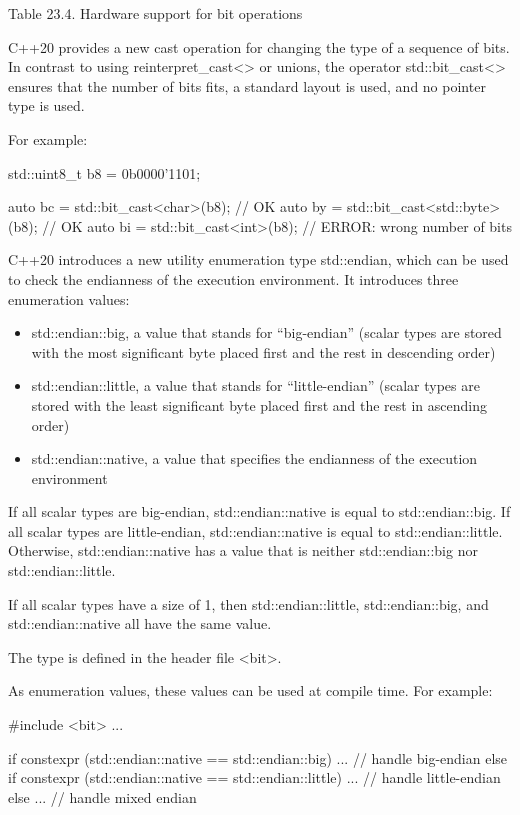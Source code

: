 \begin{center}
Table 23.4. Hardware support for bit operations
\end{center}


C++20 provides a new cast operation for changing the type of a sequence of bits. In contrast to using reinterpret\_cast<> or unions, the operator std::bit\_cast<> ensures that the number of bits fits, a standard layout is used, and no pointer type is used.

For example:

\begin{cpp}
std::uint8_t b8 = 0b0000'1101;

auto bc = std::bit_cast<char>(b8); // OK
auto by = std::bit_cast<std::byte>(b8); // OK
auto bi = std::bit_cast<int>(b8); // ERROR: wrong number of bits
\end{cpp}


C++20 introduces a new utility enumeration type std::endian, which can be used to check the endianness of the execution environment. It introduces three enumeration values:

\begin{itemize}
\item 
std::endian::big, a value that stands for “big-endian” (scalar types are stored with the most significant byte placed first and the rest in descending order)

\item 
std::endian::little, a value that stands for “little-endian” (scalar types are stored with the least significant byte placed first and the rest in ascending order)

\item 
std::endian::native, a value that specifies the endianness of the execution environment
\end{itemize}

If all scalar types are big-endian, std::endian::native is equal to std::endian::big. If all scalar types are little-endian, std::endian::native is equal to std::endian::little. Otherwise, std::endian::native has a value that is neither std::endian::big nor std::endian::little.

If all scalar types have a size of 1, then std::endian::little, std::endian::big, and std::endian::native all have the same value.

The type is defined in the header file <bit>.

As enumeration values, these values can be used at compile time. For example:

\begin{cpp}
#include <bit>
...

if constexpr (std::endian::native == std::endian::big) {
	... // handle big-endian
}
else if constexpr (std::endian::native == std::endian::little) {
	... // handle little-endian
}
else {
	... // handle mixed endian
}
\end{cpp}









